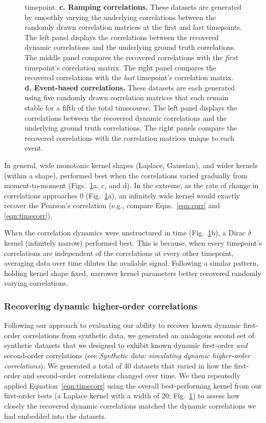 \documentclass[english]{article}
\begin{document}
\begin{figure}[tp]
{    timepoint.  \textbf{c. Ramping correlations.}  These datasets are
    generated by smoothly varying the underlying correlations between
    the randomly drawn correlation matrices at the first and last
    timepoints.  The left panel displays the correlations between the
    recovered dynamic correlations and the underlying ground truth
    correlations.  The middle panel compares the recovered
    correlations with the \textit{first} timepoint's correlation
    matrix.  The right panel compares the recovered correlations with
    the \textit{last} timepoint's correlation matrix.
    \textbf{d. Event-based correlations.}  These datasets are each
    generated using five randomly drawn correlation matrices that each
    remain stable for a fifth of the total timecourse.  The left panel
    displays the correlations between the recovered dynamic
    correlations and the underlying ground truth correlations.  The
    right panels compare the recovered correlations with the
    correlation matrices unique to each event.}
  \label{fig:synthetic}
\end{figure}

In general, wide monotonic kernel shapes (Laplace, Gaussian), and
wider kernels (within a shape), performed best when the correlations
varied gradually from moment-to-moment (Figs.~\ref{fig:synthetic}a, c,
and d).  In the extreme, as the rate of change in correlations
approaches 0 (Fig.~\ref{fig:synthetic}a), an infinitely wide kernel
would exactly recover the Pearson's correlation (e.g., compare
Eqns.~\ref{eqn:corr} and \ref{eqn:timecorr}).

When the correlation dynamics were unstructured in time
(Fig.~\ref{fig:synthetic}b), a Dirac $\delta$ kernel (infinitely
narrow) performed best.  This is because, when every timepoint's
correlations are independent of the correlations at every other
timepoint, averaging data over time dilutes the available signal.
Following a similar pattern, holding kernel shape fixed, narrower
kernel parameters better recovered randomly varying correlations.

\subsubsection*{Recovering dynamic higher-order correlations}
Following our approach to evaluating our ability to recover known
dynamic first-order correlations from synthetic data, we generated an
analogous second set of synthetic datasets that we designed to exhibit
known dynamic first-order \textit{and} second-order correlations (see
\textit{Synthetic data: simulating dynamic higher-order
  correlations}).  We generated a total of 40 datasets that varied in
how the first-order and second-order correlations changed over time.
We then repeatedly applied Equation~\ref{eqn:timecorr} using the
overall best-performing kernel from our first-order tests (a Laplace
kernel with a width of 20; Fig.~\ref{fig:synthetic}) to assess how
closely the recovered dynamic correlations matched the dynamic
correlations we had embedded into the datasets.
\end{document}
